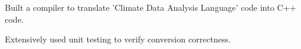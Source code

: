 \documentclass[]{rinkal_resume}
\begin{document}
\begin{minipage}[t]{0.69\textwidth}

\begin{tightemize}
\item  Built a compiler to translate 'Climate Data Analysis Language' code into C++ code. 
\item Extensively used unit testing to verify conversion correctness.
\end{tightemize}
\smallsectionsep

\end{minipage} 
\end{document}
